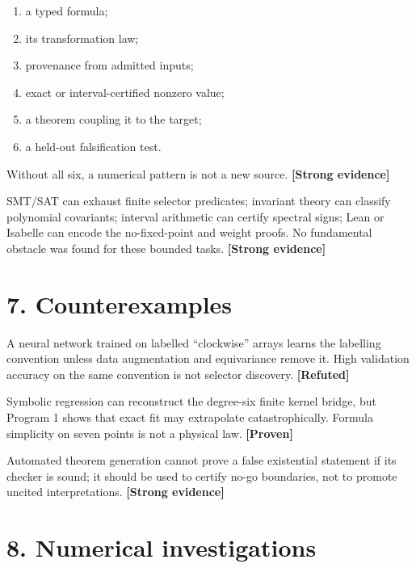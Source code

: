 \documentclass[11pt,a4paper,openany]{report}
\newcommand{\statusProven}{\textcolor{fingreen}{[Proven]}}
\newcommand{\statusStrong}{\textcolor{finblue}{[Strong evidence]}}
\newcommand{\statusRefuted}{\textcolor{finred}{[Refuted]}}
\begin{document}
\begin{enumerate}
\item 
a typed formula;

\item 
its transformation law;

\item 
provenance from admitted inputs;

\item 
exact or interval-certified nonzero value;

\item 
a theorem coupling it to the target;

\item 
a held-out falsification test.

\end{enumerate}

Without all six, a numerical pattern is not a new source. \textbf{\statusStrong{}}

SMT/\allowbreak{}SAT can exhaust finite selector predicates; invariant theory can classify polynomial covariants; interval arithmetic can certify spectral signs; Lean or Isabelle can encode the no-fixed-point and weight proofs. No fundamental obstacle was found for these bounded tasks. \textbf{\statusStrong{}}

\section{7. Counterexamples}

A neural network trained on labelled “clockwise” arrays learns the labelling convention unless data augmentation and equivariance remove it. High validation accuracy on the same convention is not selector discovery. \textbf{\statusRefuted{}}

Symbolic regression can reconstruct the degree-six finite kernel bridge, but Program 1 shows that exact fit may extrapolate catastrophically. Formula simplicity on seven points is not a physical law. \textbf{\statusProven{}}

Automated theorem generation cannot prove a false existential statement if its checker is sound; it should be used to certify no-go boundaries, not to promote uncited interpretations. \textbf{\statusStrong{}}

\section{8. Numerical investigations}
\end{document}
